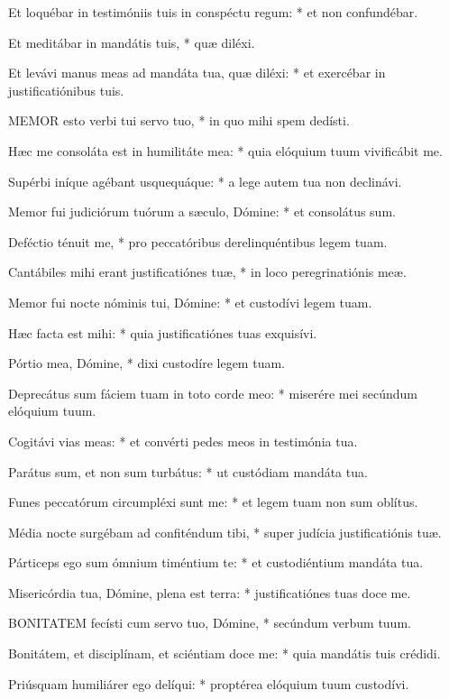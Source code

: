 Et loquébar in testimóniis tuis in conspéctu regum: * et non confundébar.

Et meditábar in mandátis tuis, * quæ diléxi.

Et levávi manus meas ad mandáta tua, quæ diléxi: * et exercébar in justificatiónibus tuis.


\lettrine[lines=2]{M}{EMOR} esto verbi tui servo tuo, * in quo mihi spem dedísti.

Hæc me consoláta est in humilitáte mea: * quia elóquium tuum vivificábit me.

Supérbi iníque agébant usquequáque: * a lege autem tua non declinávi.

Memor fui judiciórum tuórum a sæculo, Dómine: * et consolátus sum.

Deféctio ténuit me, * pro peccatóribus derelinquéntibus legem tuam.

Cantábiles mihi erant justificatiónes tuæ, * in loco peregrinatiónis meæ.

Memor fui nocte nóminis tui, Dómine: * et custodívi legem tuam.

Hæc facta est mihi: * quia justificatiónes tuas exquisívi.

Pórtio mea, Dómine, * dixi custodíre legem tuam.

Deprecátus sum fáciem tuam in toto corde meo: * miserére mei secúndum elóquium tuum.

Cogitávi vias meas: * et convérti pedes meos in testimónia tua.

Parátus sum, et non sum turbátus: * ut custódiam mandáta tua.

Funes peccatórum circumpléxi sunt me: * et legem tuam non sum oblítus.

Média nocte surgébam ad confiténdum tibi, * super judícia justificatiónis tuæ.

Párticeps ego sum ómnium timéntium te: * et custodiéntium mandáta tua.

Misericórdia tua, Dómine, plena est terra: * justificatiónes tuas doce me.


\lettrine[lines=2]{B}{ONITATEM} fecísti cum servo tuo, Dómine, * secúndum verbum tuum.

Bonitátem, et disciplínam, et sciéntiam doce me: * quia mandátis tuis crédidi.

Priúsquam humiliárer ego delíqui: * proptérea elóquium tuum custodívi.

